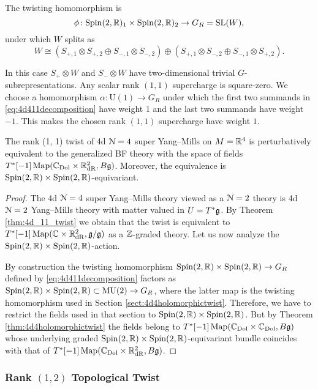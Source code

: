 \documentclass[10pt, oneside]{article}
\newcommand{\MU}{\mathrm{MU}}
\renewcommand{\U}{\mathrm{U}}
\begin{document}
The twisting homomorphism is
\[
\phi \colon \mathrm{Spin}(2, \mathbb R)_1 \times \mathrm{Spin}(2, \mathbb R)_2 \to G_R=\mathrm{SL}(W),
\]
under which $W$ splits as
\begin{equation}
W\cong (S_{+, 1}\otimes S_{+, 2}\oplus S_{-, 1}\otimes S_{-, 2})\oplus (S_{+, 1}\otimes S_{-, 2}\oplus S_{-, 1}\otimes S_{+, 2}).
\label{eq:4d411decomposition}
\end{equation}

In this case $S_+\otimes W$ and $S_-\otimes W$ have two-dimensional trivial $G$-subrepresentations. Any scalar rank $(1, 1)$ supercharge is square-zero. We choose a homomorphism $\alpha\colon \U(1)\rightarrow G_R$ under which the first two summands in \eqref{eq:4d411decomposition} have weight $1$ and the last two summands have weight $-1$. This makes the chosen rank $(1, 1)$ supercharge have weight $1$.

\begin{theorem}
The rank (1, 1) twist of 4d $\mathcal N=4$ super Yang--Mills on $M=\mathbb R^4$ is perturbatively equivalent to the generalized BF theory with the space of fields $T^*[-1] \operatorname{Map}(\mathbb C_{\rm Dol}\times \mathbb R^2_{\mathrm{dR}}, B \mathfrak g)$. Moreover, the equivalence is $\mathrm{Spin}(2, \mathbb R)\times \mathrm{Spin}(2, \mathbb R)$-equivariant.
\label{thm:4d4partialtwist}
\end{theorem}
\begin{proof}
The 4d $\mathcal N=4$ super Yang--Mills theory viewed as a $\mathcal N=2$ theory is 4d $\mathcal N=2$ Yang--Mills theory with matter valued in $U=T^*\mathfrak g$. By Theorem \ref{thm:4d_11_twist} we obtain that the twist is equivalent to $T^*[-1]\operatorname{Map}(\mathbb C\times \mathbb R^2_{\mathrm{dR}}, \mathfrak g/\mathfrak g)$ as a $\mathbb Z$-graded theory. Let us now analyze the $\mathrm{Spin}(2, \mathbb R)\times \mathrm{Spin}(2, \mathbb R)$-action.

By construction the twisting homomorphism $\mathrm{Spin}(2,\mathbb R)\times \mathrm{Spin}(2, \mathbb R)\rightarrow G_R$ defined by \eqref{eq:4d411decomposition} factors as $\Spin(2, \RR)\times \Spin(2, \RR)\subset \MU(2)\rightarrow G_R$, where the latter map is the twisting homomorphism used in Section \ref{sect:4d4holomorphictwist}. Therefore, we have to restrict the fields used in that section to $\mathrm{Spin}(2, \mathbb R)\times \mathrm{Spin}(2, \mathbb R)$. But by Theorem \ref{thm:4d4holomorphictwist} the fields belong to $T^*[-1]\operatorname{Map}(\mathbb C_{\rm Dol}\times \mathbb C_{\rm Dol}, B\mathfrak g)$ whose underlying graded $\mathrm{Spin}(2, \mathbb R)\times \mathrm{Spin}(2, \mathbb R)$-equivariant bundle coincides with that of $T^*[-1]\operatorname{Map}(\mathbb C_{\rm Dol}\times \mathbb R^2_{\mathrm{dR}}, B\mathfrak g)$.
\end{proof}

\subsubsection{Rank \texorpdfstring{$(1, 2)$}{(1,2)} Topological Twist}
\end{document}
